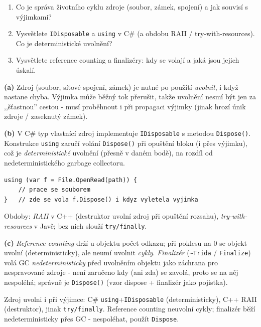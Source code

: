 \begin{zadani}
\begin{enumerate}[label=(\alph*)]
  \item {} Co je správa životního cyklu zdroje (soubor, zámek, spojení) a jak souvisí s výjimkami?
  \item {} Vysvětlete \texttt{IDisposable} a \texttt{using} v C\# (a obdobu RAII / try-with-resources). Co je deterministické uvolnění?
  \item {} Vysvětlete reference counting a finalizéry: kdy se volají a jaká jsou jejich úskalí.
\end{enumerate}
\end{zadani}

\begin{reseni}
\textbf{(a)} Zdroj (soubor, síťové spojení, zámek) je nutné po použití \emph{uvolnit}, i když nastane chyba. Výjimka může běžný tok přerušit, takže uvolnění nesmí být jen za ,,šťastnou'' cestou - musí proběhnout i při propagaci výjimky (jinak hrozí únik zdroje / zaseknutý zámek).

\textbf{(b)} V C\# typ vlastnící zdroj implementuje \texttt{IDisposable} s metodou \texttt{Dispose()}. Konstrukce \texttt{using} zaručí volání \texttt{Dispose()} při opuštění bloku (i přes výjimku), což je \emph{deterministické} uvolnění (přesně v daném bodě), na rozdíl od nedeterministického garbage collectoru.
\begin{lstlisting}
using (var f = File.OpenRead(path)) {
    // prace se souborem
}   // zde se vola f.Dispose() i kdyz vyletela vyjimka
\end{lstlisting}
Obdoby: \emph{RAII} v C++ (destruktor uvolní zdroj při opuštění rozsahu), \emph{try-with-resources} v Javě; bez nich slouží \texttt{try/finally}.

\textbf{(c)} \emph{Reference counting} drží u objektu počet odkazu; při poklesu na 0 se objekt uvolní (deterministicky), ale neumí uvolnit \emph{cykly}. \emph{Finalizér} (\texttt{\textasciitilde Trida} / \texttt{Finalize}) volá GC \emph{nedeterministicky} před uvolněním objektu jako záchrana pro nespravované zdroje - není zaručeno kdy (ani zda) se zavolá, proto se na něj nespoléhá; správně je \texttt{Dispose()} (vzor dispose + finalizér jako pojistka).
\end{reseni}

\begin{jadro}
Zdroj uvolni i při výjimce: C\# \texttt{using}+\texttt{IDisposable} (deterministicky), C++ RAII (destruktor), jinak \texttt{try/finally}. Reference counting neuvolní cykly; finalizér běží nedeterministicky přes GC - nespoléhat, použít \texttt{Dispose}.
\end{jadro}

